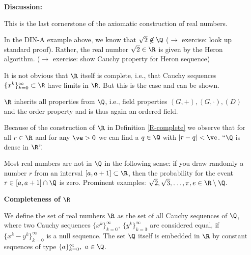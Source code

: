{\begin{frame}
{\bf Discussion:} 
\ite
\item This is the last cornerstone of the axiomatic construction of real numbers. 
\item In the DIN-A example above, we know that $\sqrt{2}\not\in\Q$ ($\rightarrow$ exercise: look up standard proof). Rather, the real number  $\sqrt{2}\in\R$ is given by the Heron algorithm. ($\rightarrow$ exercise: show Cauchy property for Heron sequence)
\item It is not obvious that $\R$ itself is complete, i.e., that Cauchy sequences $\{x^k\}_{k=0}^\infty\subset\R$ have limits in $\R$. But this is the case and can be shown.
\item $\R$ inherits all properties from $\Q$, i.e., field properties $(G,+), (G,\cdot), (D)$ and the order property and is thus again an ordered field.
\item Because of the construction of $\R$ in Definition \ref{R-complete} we observe that for all $r\in\R$ and for any $\ve>0$ we can find a $q\in\Q$ with
$|r-q|<\ve$. ``$\Q$ is dense in $\R$''.
\item Most real numbers are not in $\Q$ in the following sense: if you draw randomly a number $r$ from an interval $[a,a+1]\subset\R$, then the probability for the event $r\in [a,a+1]\cap\Q$ is zero. Prominent examples: $\sqrt{2}, \sqrt{3},\ldots, \pi, e\in\R\setminus\Q$.
\eti
\end{frame}
\textbf{Completeness of $\R$}
\begin{defi} \label{R-complete} We define the set of real numbers $\R$ as the set of all Cauchy sequences of $\Q$, where two Cauchy sequences $\{x^k\}_{k=0}^\infty,~\{y^k\}_{k=0}^\infty$ are considered equal, if $\{x^k-y^k\}_{k=0}^\infty$ is a null sequence. The set $\Q$ itself is embedded in $\R$ by constant sequences of type $\{a\}_{k=0}^\infty,~ a\in\Q$.
\end{defi}

}
